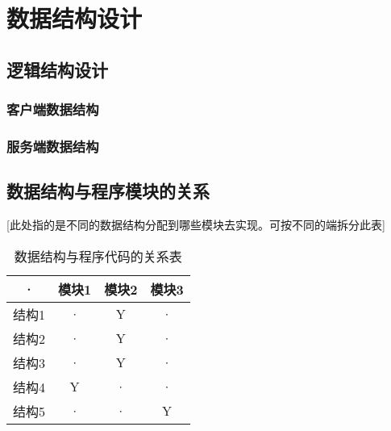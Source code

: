 \chapter{数据结构设计}
\section{逻辑结构设计}

\subsection{客户端数据结构}

\subsection{服务端数据结构}


\section{数据结构与程序模块的关系}
[此处指的是不同的数据结构分配到哪些模块去实现。可按不同的端拆分此表]
\begin{table}[htbp]
\centering
\caption{数据结构与程序代码的关系表} \label{tab:datastructure-module}
\begin{tabular}{|c|c|c|c|}
    \hline
    · & 模块1 & 模块2 & 模块3 \\
    \hline
    结构1 & · & Y & · \\
    \hline
    结构2 & · & Y & · \\
    \hline
    结构3 & · & Y & · \\
    \hline
    结构4 & Y & · & · \\
    \hline
    结构5 & · & · & Y \\
    \hline
\end{tabular}
\end{table}